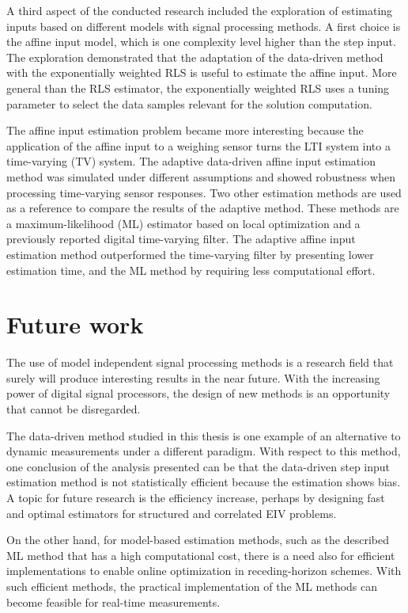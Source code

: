 A third aspect of the conducted research included the exploration of estimating inputs based on different models with signal processing methods. 
A first choice is the affine input model, which is one complexity level higher than the step input.
The exploration demonstrated that the adaptation of the data-driven method with the exponentially weighted RLS is useful to estimate the affine input.
More general than the RLS estimator, the exponentially weighted RLS uses a tuning parameter to select the data samples relevant for the solution computation.

The affine input estimation problem became more interesting because the application of the affine input to a weighing sensor turns the LTI system into a time-varying (TV) system. 
The adaptive data-driven affine input estimation method was simulated under different assumptions and showed robustness when processing time-varying sensor responses.
Two other estimation methods are used as a reference to compare the results of the adaptive method.
These methods are a maximum-likelihood (ML) estimator based on local optimization and a previously reported digital time-varying filter.
The adaptive affine input estimation method outperformed the time-varying filter by presenting lower estimation time, and the ML method by requiring less computational effort.  


\section*{Future work}

The use of model independent signal processing methods is a research field that surely will produce interesting results in the near future. 
With the increasing power of digital signal processors, the design of new methods is an opportunity that cannot be disregarded.

The data-driven method studied in this thesis is one example of an alternative to dynamic measurements under a different paradigm.
With respect to this method, one conclusion of the analysis presented can be that the data-driven step input estimation method is not statistically efficient because the estimation shows bias.
A topic for future research is the efficiency increase, perhaps by designing fast and optimal estimators for structured and correlated EIV problems. 

On the other hand, for model-based estimation methods, such as the described ML method that has a high computational cost, there is a need also for efficient implementations to enable online optimization in receding-horizon schemes. 
With such efficient methods, the practical implementation of the ML methods can become feasible for real-time measurements.



